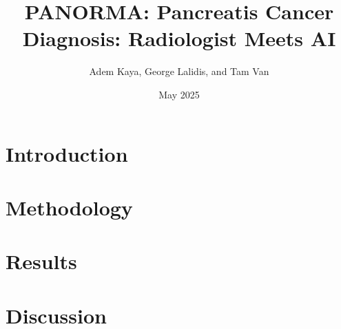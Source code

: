 \documentclass[12pt]{article}
\title{PANORMA: Pancreatis Cancer Diagnosis: Radiologist Meets AI}
\author{Adem Kaya, George Lalidis, and Tam Van}
\date{May 2025}
\begin{document}
\maketitle

\section{Introduction}

\section{Methodology}
\section{Results}
\section{Discussion}
\printbibliography
\end{document}
